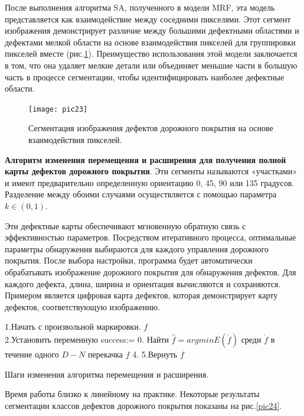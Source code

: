 \documentclass[a4paper,14pt]{extreport}
\begin{document}
После выполнения алгоритма SA, полученного в модели MRF, эта модель представляется как взаимодействие между соседними пикселями. Этот сегмент изображения демонстрирует различие между большими дефектными областями и дефектами мелкой области на основе взаимодействия пикселей для группировки пикселей вместе (рис.\ref{pic23}). Преимущество использования этой модели заключается в том, что она удаляет мелкие детали или объединяет меньшие части в большую часть в процессе сегментации, чтобы идентифицировать наиболее дефектные области.

\begin{figure}[ht!]
\centering
\texttt{[image: pic23]}
\caption{Сегментация изображения дефектов дорожного покрытия на основе взаимодействия пикселей.}
	\label{pic23}
		\end{figure} 
		
\textbf{Алгоритм изменения перемещения и расширения для получения полной карты дефектов дорожного покрытия}. Эти сегменты называются «участками» и имеют предварительно определенную ориентацию 0, 45, 90 или 135 градусов. Разделение между обоими случаями осуществляется с помощью параметра $k \in \left(0,1\right)$. 

Эти дефектные карты обеспечивают мгновенную обратную связь с эффективностью параметров. Посредством итеративного процесса, оптимальные параметры обнаружения выбираются для каждого управления дорожного покрытия. После  выбора настройки, программа будет автоматически обрабатывать изображение дорожного покрытия для обнаружения дефектов. Для каждого дефекта, длина, ширина и ориентация вычисляются и сохраняются. Примером является цифровая карта дефектов, которая демонстрирует карту дефектов, соответствующую изображению.

\begin{algorithm}[H]
 1.Начать с произвольной маркировки. $f$\\
 2.Установить переменную success:= 0.
     {
		Найти $\hat{f} = argminE(\acute{f})$ среди $\acute{f}$ в течение одного $D-N$ перекачка $f$\;
		}
4.
5.Вернуть $f$
\caption{Шаги изменения алгоритма  перемещения и расширения.} \label{alg4}
\end{algorithm}

Время работы близко к линейному на практике. Некоторые результаты сегментации классов дефектов дорожного покрытия показаны на рис.\ref{pic24}.
\end{document}
